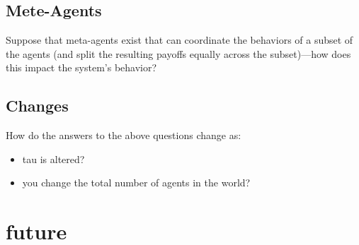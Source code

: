 \documentclass[]{article}
\begin{document}
\subsection{Mete-Agents}Suppose that meta-agents exist that can coordinate the behaviors of a subset of the agents (and split the resulting payoffs equally across the subset)---how does this impact the system's behavior?
\subsection{Changes}How do the answers to the above questions change as:
\begin{itemize}
	\item tau is altered?
	\item you change the total number of agents in the world?
\end{itemize}

\section{future}

\medskip



\end{document}
